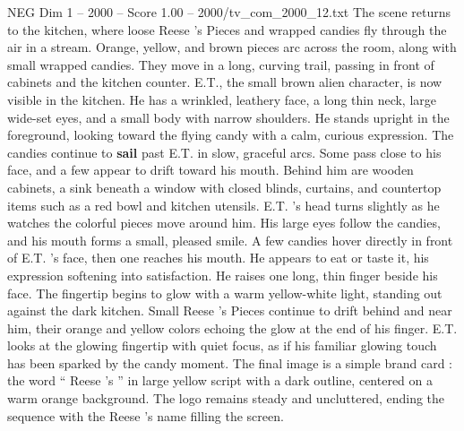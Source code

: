 \begin{textsample}{NEG Dim 1 – 2000 – Score 1.00 – 2000/tv\_com\_2000\_12.txt}
The scene returns to the kitchen, where loose Reese ’s Pieces and wrapped candies fly through the air in a stream.
Orange, yellow, and brown pieces arc across the room, along with small wrapped candies.
They move in a long, curving trail, passing in front of cabinets and the kitchen counter.
E.T., the small brown alien character, is now visible in the kitchen.
He has a wrinkled, leathery face, a long thin neck, large wide-set eyes, and a small body with narrow shoulders.
He stands upright in the foreground, looking toward the flying candy with a calm, curious expression.
The candies continue to \textbf{sail} past E.T. in slow, graceful arcs.
Some pass close to his face, and a few appear to drift toward his mouth.
Behind him are wooden cabinets, a sink beneath a window with closed blinds, curtains, and countertop items such as a red bowl and kitchen utensils.
E.T. ’s head turns slightly as he watches the colorful pieces move around him.
His large eyes follow the candies, and his mouth forms a small, pleased smile.
A few candies hover directly in front of E.T. ’s face, then one reaches his mouth.
He appears to eat or taste it, his expression softening into satisfaction.
He raises one long, thin finger beside his face.
The fingertip begins to glow with a warm yellow-white light, standing out against the dark kitchen.
Small Reese ’s Pieces continue to drift behind and near him, their orange and yellow colors echoing the glow at the end of his finger.
E.T. looks at the glowing fingertip with quiet focus, as if his familiar glowing touch has been sparked by the candy moment.
The final image is a simple brand card : the word “ Reese ’s ” in large yellow script with a dark outline, centered on a warm orange background.
The logo remains steady and uncluttered, ending the sequence with the Reese ’s name filling the screen.

\end{textsample}
